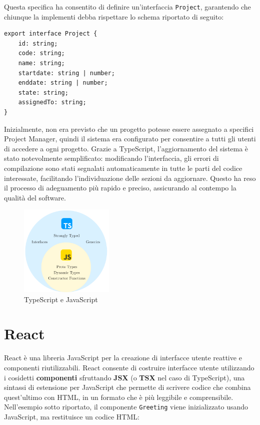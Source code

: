 \documentclass[target=bach,aauheader=,style=]{thud}
\begin{document}
\noindent Questa specifica ha consentito di definire un'interfaccia \texttt{Project}, garantendo che chiunque la implementi debba rispettare lo schema riportato di seguito:

\begin{lstlisting}[language=React, caption=Interfaccia di progetto]
export interface Project {
    id: string;
    code: string;
    name: string;
    startdate: string | number;
    enddate: string | number;
    state: string;
    assignedTo: string;
}
\end{lstlisting}

\noindent Inizialmente, non era previsto che un progetto potesse essere assegnato a specifici Project Manager, quindi il sistema era configurato per consentire a tutti gli utenti di accedere a ogni progetto. Grazie a TypeScript, l'aggiornamento del sistema è stato notevolmente semplificato: modificando l'interfaccia, gli errori di compilazione sono stati segnalati automaticamente in tutte le parti del codice interessate, facilitando l'individuazione delle sezioni da aggiornare. Questo ha reso il processo di adeguamento più rapido e preciso, assicurando al contempo la qualità del software.

\begin{figure}[H]
    \centering
    \includegraphics[width=0.4\textwidth]{img/typescript_and_javascript.pdf} 
    \caption{TypeScript e JavaScript}
\end{figure}

\section{React}
React è una libreria JavaScript per la creazione di interfacce utente reattive e componenti riutilizzabili. React consente di costruire interfacce utente utilizzando i cosidetti \textbf{componenti} sfruttando \textbf{JSX} (o \textbf{TSX} nel caso di TypeScript), una sintassi di estensione per JavaScript che permette di scrivere codice che combina quest'ultimo con HTML, in un formato che è più leggibile e comprensibile. Nell'esempio sotto riportato, il componente \texttt{Greeting} viene inizializzato usando JavaScript, ma restituisce un codice HTML:
\end{document}
